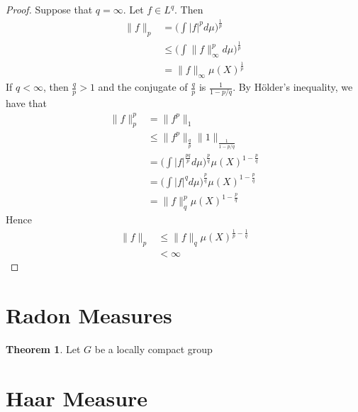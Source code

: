 \documentclass[12pt]{amsart}
\theoremstyle{definition}
\newtheorem{thm}[definition]{Theorem}
\begin{document}
	\begin{proof}
		Suppose that $q = \infty$. Let $f \in L^q$. Then
		\begin{align*}
			\|f \|_p 
			&= \bigg(\int \vert f \vert^p d \mu \bigg)^{\frac{1}{p}} \\
			& \leq \bigg(\int \| f \|_{\infty} ^p d \mu \bigg)^{\frac{1}{p}} \\
			&= \|f \|_{\infty} \mu(X)^{\frac{1}{p}}
		\end{align*} 
		If $q < \infty$, then $\frac{q}{p} > 1$ and the conjugate of $\frac{q}{p}$ is $\frac{1}{1- p/q}$. By Hölder's inequality, we have that 
		\begin{align*}
			\|f \|_p^p 
			&= \|f^p \|_1 \\
			&\leq \|f^p \|_{\frac{q}{p}} \|1 \|_{\frac{1}{1-p/q}} \\
			&= \bigg(\int |f|^{\frac{pq}{p}} d \mu \bigg)^{\frac{p}{q}} \mu(X)^{1-\frac{p}{q}} \\
			&= \bigg(\int |f|^{q} d \mu \bigg)^{\frac{p}{q}}\mu(X)^{1-\frac{p}{q}} \\
			&= \|f \|_q^p\mu(X)^{1-\frac{p}{q}}
		\end{align*}
		Hence 
		\begin{align*}
			\|f \|_p 
			&\leq \|f \|_q\mu(X)^{\frac{1}{p}-\frac{1}{q}} \\
			&< \infty
		\end{align*}
	\end{proof}
	
	
	
	
	
	
	
	
	

	
	
	
	
	

	
	
	
	\newpage
	\section{Radon Measures}
	\begin{thm}
		Let $G$ be a locally compact group 
	\end{thm}
	
	
	
	
	
	
	
	
	
	
	
	
	
	
	\newpage
	\section{Haar Measure}
	
\end{document}
